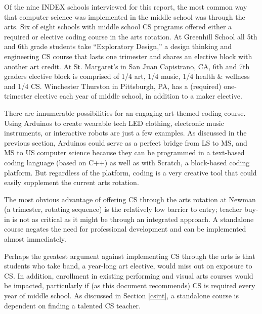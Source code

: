 Of the nine INDEX schools interviewed for this report, the most common way that computer science was implemented in the middle school was through the arts. Six of eight schools with middle school CS programs offered either a required or elective coding course in the arts rotation. At Greenhill School all 5th and 6th grade students take ``Exploratory Design,'' a design thinking and engineering CS course that lasts one trimester and shares an elective block with another art credit. At St. Margaret's in San Juan Capistrano, CA, 6th and 7th graders elective block is comprised of 1/4 art, 1/4 music, 1/4 health \& wellness and 1/4 CS. Winchester Thurston in Pittsburgh, PA, has a (required) one-trimester elective each year of middle school, in addition to a maker elective.\par
There are innumerable possibilities for an engaging art-themed coding course. Using Arduinos to create wearable tech LED clothing, electronic music instruments, or interactive robots are just a few examples. As discussed in the previous section, Arduinos could serve as a perfect bridge from LS to MS, and MS to US computer science because they can be programmed in a text-based coding language (based on C++) as well as with Scratch, a block-based coding platform. But regardless of the platform, coding is a very creative tool that could easily supplement the current arts rotation.\par
The most obvious advantage of offering CS through the arts rotation at Newman (a trimester, rotating sequence) is the relatively low barrier to entry; teacher buy-in is not as critical as it might be through an integrated approach. A standalone course negates the need for professional development and can be implemented almost immediately.\par
Perhaps the greatest argument against implementing CS through the arts is that students who take band, a year-long art elective, would miss out on exposure to CS. In addition, enrollment in existing performing and visual arts courses would be impacted, particularly if (as this document recommends) CS is required every year of middle school. As discussed in Section \ref{csint}, a standalone course is dependent on finding a talented CS teacher. \par

